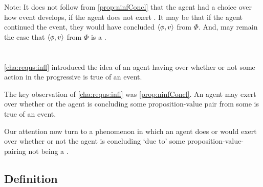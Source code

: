 \begin{note}
  Note:
  It does not follow from \autoref{prop:ninfConcl} that the agent had a choice over how event develops, if the agent does not exert \ninf{}.
  It may be that if the agent continued the event, they would have concluded \(\langle \phi, v \rangle\) from \(\Phi\).
  And, may remain the case that \(\langle \phi, v \rangle\) from \(\Phi\) is a \fc{}.
\end{note}

\section{}
\label{cha:requs:requs}

\begin{note}
  \autoref{cha:requs:infl} introduced the idea of an agent having \ninf{} over whether or not some action in the progressive is true of an event.

  The key observation of \autoref{cha:requs:infl} was \autoref{prop:ninfConcl}.
  An agent may exert \ninf{} over whether or the agent is concluding some proposition-value pair from some \pool{} is true of an event.

  Our attention now turn to a phenomenon in which an agent does or would exert \ninf{} over whether or not the agent is concluding `due to' some proposition-value-\pool{} pairing not being a \fc{}.
\end{note}

\subsection{Definition}
\label{cha:requs:def}

